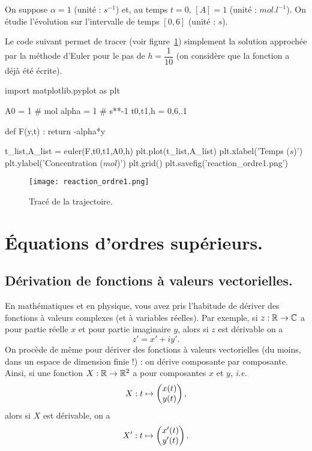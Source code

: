 On suppose $\alpha=1$ (unité : $s^{-1}$) et, au temps $t=0$, $[A] =
1$ (unité : $mol.l^{-1}$). 
On étudie l'évolution sur l'intervalle de temps $[0,6]$ (unité : $s$).


Le code suivant permet de tracer (voir figure~\ref{11:fig:reaction_ordre1}) simplement la solution approchée par la méthode d'Euler pour le pas de $h=\dfrac{1}{10}$ (on considère que la fonction  a déjà été écrite). 

\begin{pyverbatim}
import matplotlib.pyplot as plt

A0 = 1 # mol
alpha = 1 # s**-1
t0,t1,h = 0,6,.1

def F(y,t) :
    return -alpha*y

t_list,A_list = euler(F,t0,t1,A0,h)
plt.plot(t_list,A_list)
plt.xlabel('Temps ($s$)')
plt.ylabel('Concentration ($mol$)')
plt.grid()
plt.savefig('reaction_ordre1.png')
\end{pyverbatim}
\begin{figure}[!h]
    \begin{center}
        \texttt{[image: reaction\_ordre1.png]}
        \caption{Tracé de la trajectoire.}
        \label{11:fig:reaction_ordre1}
    \end{center}
\end{figure}

\section{Équations d'ordres supérieurs.}

\subsection{Dérivation de fonctions à valeurs vectorielles.}

En mathématiques et en physique, vous avez pris l'habitude de dériver des fonctions à valeurs complexes (et à variables réelles). 
Par exemple, si $z : \mathbb{R}\to\mathbb{C}$ a pour partie réelle $x$ et pour partie imaginaire $y$, alors si $z$ est dérivable on a 
\begin{equation*}
    z' = x' + iy'.
\end{equation*}
On procède de même pour dériver des fonctions à valeurs vectorielles (du moins, dans un espace de dimension finie !) : on dérive composante par composante. 
Ainsi, si une fonction $X : \mathbb{R}\to\mathbb{R}^2$ a pour composantes $x$ et $y$, \emph{i.e.} 
\begin{equation*}
    X : t \mapsto \begin{pmatrix} x(t) \\ y(t) \end{pmatrix},
\end{equation*}
alors si $X$ est dérivable, on a 
\begin{equation*}
    X' : t \mapsto \begin{pmatrix} x'(t) \\ y'(t) \end{pmatrix}.
\end{equation*}

